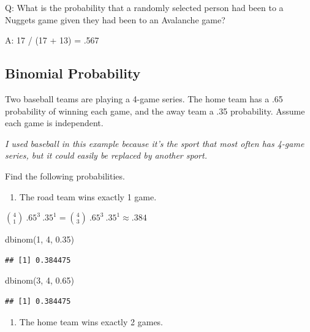 \documentclass[
  11pt,
]{book}
\newenvironment{Shaded}{\begin{snugshade}}{\end{snugshade}}
\newcommand{\DecValTok}[1]{\textcolor[rgb]{0.00,0.00,0.81}{#1}}
\newcommand{\FloatTok}[1]{\textcolor[rgb]{0.00,0.00,0.81}{#1}}
\newcommand{\FunctionTok}[1]{\textcolor[rgb]{0.00,0.00,0.00}{#1}}
\newcommand{\NormalTok}[1]{#1}
\providecommand{\tightlist}{%
  \setlength{\itemsep}{0pt}\setlength{\parskip}{0pt}}
\theoremstyle{definition}
\theoremstyle{definition}
\theoremstyle{definition}
\theoremstyle{definition}
\theoremstyle{remark}
\begin{document}
Q: What is the probability that a randomly selected person had been to a Nuggets game given they had been to an Avalanche game?

A: 17 / (17 + 13) = .567

\hypertarget{binomial-probability}{%
\subsection{Binomial Probability}\label{binomial-probability}}

Two baseball teams are playing a 4-game series. The home team has a .65 probability of winning each game, and the away team a .35 probability. Assume each game is independent.

\emph{I used baseball in this example because it's the sport that most often has 4-game series, but it could easily be replaced by another sport.}

Find the following probabilities.

\begin{enumerate}
\def\labelenumi{(\alph{enumi})}
\tightlist
\item
  The road team wins exactly 1 game.
\end{enumerate}

\(\binom{4}{1}\ .65^3\ .35^1 = \binom{4}{3}\ .65^3\ .35^1 \approx .384\)

\begin{Shaded}
\begin{Highlighting}[]
\FunctionTok{dbinom}\NormalTok{(}\DecValTok{1}\NormalTok{, }\DecValTok{4}\NormalTok{, }\FloatTok{0.35}\NormalTok{)}
\end{Highlighting}
\end{Shaded}

\begin{verbatim}
## [1] 0.384475
\end{verbatim}

\begin{Shaded}
\begin{Highlighting}[]
\FunctionTok{dbinom}\NormalTok{(}\DecValTok{3}\NormalTok{, }\DecValTok{4}\NormalTok{, }\FloatTok{0.65}\NormalTok{)}
\end{Highlighting}
\end{Shaded}

\begin{verbatim}
## [1] 0.384475
\end{verbatim}

\begin{enumerate}
\def\labelenumi{(\alph{enumi})}
\setcounter{enumi}{1}
\tightlist
\item
  The home team wins exactly 2 games.
\end{enumerate}
\end{document}
